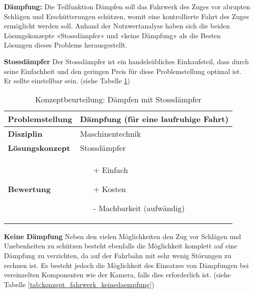 \documentclass[../../main.tex]{subfiles}
\begin{document}
  \textbf{Dämpfung:}
  Die Teilfunktion Dämpfen soll das Fahrwerk des Zuges vor abrupten Schlägen und Erschütterungen schützen, womit eine kontrollierte Fahrt des Zuges ermöglicht werden soll. Anhand der Nutzwertanalyse haben sich die beiden Lösungskonzepte «Stossdämpfer» und «keine Dämpfung» als die Besten Lösungen dieses Problems herausgestellt.

  \textbf{Stossdämpfer}
  Der Stossdämpfer ist ein handelsübliches Einkaufsteil, dass durch seine Einfachheit und den geringen Preis für diese Problemstellung optimal ist. Er sollte einstellbar sein. (siehe Tabelle \ref{tab:konzept_fahrwerk_stossdaempfer})

  \begin{flushleft}
    \begin{table}[h]
    \begin{tabular}{ | l | p{11cm} |}
    \hline
    \textbf{Problemstellung} & Dämpfung (für eine laufruhige Fahrt) \\ \hline
    \textbf{Disziplin} & Maschinentechnik \\ \hline
    \textbf{Lösungskonzept} & Stossdämpfer \\ \hline
    \textbf{Bewertung} &  \begin{itemize}
                            \item[+] Einfach
                            \item[+] Kosten
                            \item[-] Machbarkeit (aufwändig)
                          \end{itemize} \\ \hline
    \end{tabular}
    \caption{Konzeptbeurteilung: Dämpfen mit Stossdämpfer}
    \label{tab:konzept_fahrwerk_stossdaempfer}
\end{table}
\end{flushleft}

\textbf{Keine Dämpfung}  
Neben den vielen Möglichkeiten den Zug vor Schlägen und Unebenheiten zu schützen besteht ebenfalls die Möglichkeit komplett auf eine Dämpfung zu verzichten, da auf der Fahrbahn mit sehr wenig Störungen zu rechnen ist. Es besteht jedoch die Möglichkeit des Einsatzes von Dämpfungen bei vereinzelten Komponenten wie der Kamera, falls dies erforderlich ist. (siehe Tabelle \ref{tab:konzept_fahrwerk_keinedaempfung})
\end{document}
